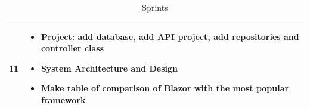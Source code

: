 \documentclass{scrartcl}
\begin{document}
\begin{table}[H]
\begin{center}
\begin{tabular}{| p{2.5cm}| p{12cm} |}
  11                &             
\begin{itemize}
 \item Project: add database, add API project, add repositories and controller class
 \item System Architecture and Design
 \item Make table of comparison of Blazor with the most popular framework


 \end{itemize}\\ \hline
 
 
 \end{tabular}
\end{center}
\caption{Sprints}
\label{table2}
\end{table}
 
 
 \pagebreak
\end{document}
